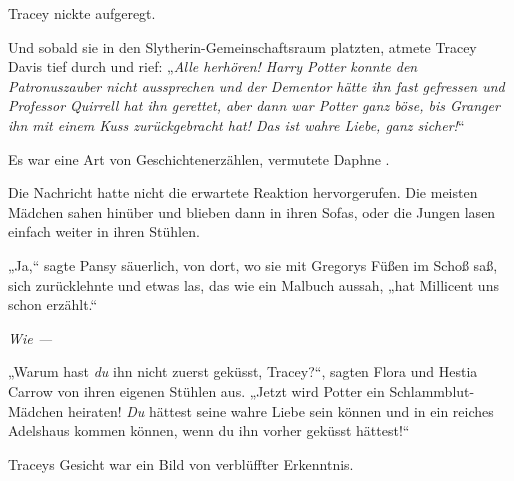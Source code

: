 Tracey nickte aufgeregt.

Und sobald sie in den Slytherin-Gemeinschaftsraum platzten, atmete Tracey Davis tief durch und rief: „\emph{Alle herhören! Harry Potter konnte den Patronuszauber nicht aussprechen und der Dementor hätte ihn fast gefressen und Professor Quirrell hat ihn gerettet, aber dann war Potter ganz böse, bis Granger ihn mit einem Kuss zurückgebracht hat! Das ist wahre Liebe, ganz sicher!}“

Es war eine Art von Geschichtenerzählen, vermutete Daphne .

Die Nachricht hatte nicht die erwartete Reaktion hervorgerufen. Die meisten Mädchen sahen hinüber und blieben dann in ihren Sofas, oder die Jungen lasen einfach weiter in ihren Stühlen.

„Ja,“ sagte Pansy säuerlich, von dort, wo sie mit Gregorys Füßen im Schoß saß, sich zurücklehnte und etwas las, das wie ein Malbuch aussah, „hat Millicent uns schon erzählt.“

\emph{Wie —}

„Warum hast \emph{du} ihn nicht zuerst geküsst, Tracey?“, sagten Flora und Hestia Carrow von ihren eigenen Stühlen aus. „Jetzt wird Potter ein Schlammblut-Mädchen heiraten! \emph{Du} hättest seine wahre Liebe sein können und in ein reiches Adelshaus kommen können, wenn du ihn vorher geküsst hättest!“

Traceys Gesicht war ein Bild von verblüffter Erkenntnis.

